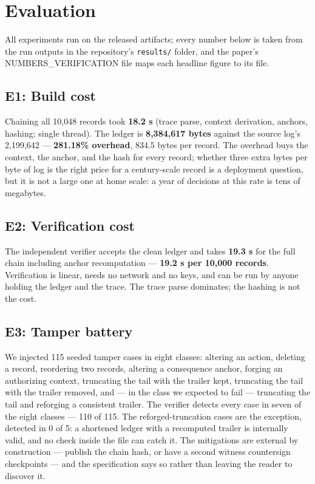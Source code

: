 \documentclass[journal]{IEEEtran}
\begin{document}
\section{Evaluation}

All experiments run on the released artifacts; every number below is
taken from the run outputs in the repository's \texttt{results/}
folder, and the paper's NUMBERS\_VERIFICATION file maps each headline
figure to its file.

\subsection{E1: Build cost}

Chaining all 10,048 records took \textbf{18.2 s} (trace parse,
context derivation, anchors, hashing; single thread). The ledger is
\textbf{8,384,617 bytes} against the source log's 2,199,642 ---
\textbf{281.18\% overhead}, 834.5 bytes per record. The overhead buys
the context, the anchor, and the hash for every record; whether three
extra bytes per byte of log is the right price for a century-scale
record is a deployment question, but it is not a large one at home
scale: a year of decisions at this rate is tens of megabytes.

\subsection{E2: Verification cost}

The independent verifier accepts the clean ledger and takes
\textbf{19.3 s} for the full chain including anchor recomputation ---
\textbf{19.2 s per 10,000 records}. Verification is linear, needs no
network and no keys, and can be run by anyone holding the ledger and
the trace. The trace parse dominates; the hashing is not the cost.

\subsection{E3: Tamper battery}

We injected 115 seeded tamper cases in eight classes:
altering an action, deleting a record, reordering two records,
altering a consequence anchor, forging an authorizing context,
truncating the tail with the trailer kept, truncating the tail with
the trailer removed, and --- in the class we expected to fail ---
truncating the tail and reforging a consistent trailer. The verifier
detects every case in seven of the eight classes --- 110 of 115. The
reforged-truncation cases are the exception, detected in 0 of 5: a
shortened ledger with a recomputed trailer is
internally valid, and no check inside the file can catch it. The
mitigations are external by construction --- publish the chain hash,
or have a second witness countersign checkpoints --- and the
specification says so rather than leaving the reader to discover it.
\end{document}
